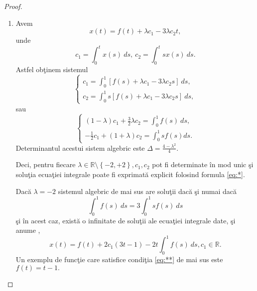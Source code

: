 \documentclass[a4paper,12pt,oneside]{report}
\begin{document}
\begin{proof}
\begin{enumerate}[label=(\alph*)]
  \item Avem
        \begin{displaymath}
        	x\left ( t \right ) = f \left ( t \right ) + \lambda c_{1} - 3 \lambda c_{2}t, \label{eq:*} \tag{*}
        \end{displaymath}
 unde
        \begin{displaymath}
        	c_{1} = \int_{0}^{t} x\left ( s \right ) \ ds,~c_{2} = \int_{0}^{t} sx\left ( s \right ) \ ds.
        \end{displaymath}
Astfel ob\c{t}inem sistemul
        \begin{displaymath}
        	\left\{\begin{matrix}
        	c_{1} = \int_{0}^{1} \left [ f\left ( s \right ) + \lambda c_{1} - 3\lambda c_{2}s \right ]\ ds,\\
        	c_{2} = \int_{0}^{1}s \left [ f\left ( s \right ) + \lambda c_{1} - 3\lambda c_{2}s \right ]\ ds,
        	\end{matrix}\right.
        \end{displaymath}
 sau
 \begin{displaymath}
        	\left\{\begin{matrix}
        	\left ( 1 - \lambda  \right )c_{1} + \frac{3}{2}\lambda c_{2} = \int_{0}^{1}f\left ( s \right ) \ ds,\\
        	-\frac{1}{2}c_{1} + \left ( 1 + \lambda  \right )c_{2} = \int_{0}^{1}s f\left ( s \right ) ds.
        	\end{matrix}\right.
        \end{displaymath}
Determinantul acestui sistem algebric este \(\Delta  =  \frac{4 - \lambda ^{2} }{4}\).

Deci, pentru fiecare \(\lambda \in \mathbb{R} \setminus \left \{ -2,+2 \right \}, c_{1}, c_{2}\) pot fi determinate \^{i}n mod unic \c{s}i solu\c{t}ia ecua\c{t}iei integrale poate fi exprimat\u{a} explicit folosind formula \ref{eq:*}.

\noindent Dac\u{a} \(\lambda = -2\) sistemul algebric de mai sus are solu\c{t}ii dac\u{a} \c{s}i numai dac\u{a}
        \begin{displaymath}
        	\int_{0}^{1}f\left ( s \right ) \ ds  = 3\int_{0}^{1}sf\left ( s  \right )\ ds \label{eq:**} \tag{**}
        \end{displaymath}
\c{s}i \^{i}n acest caz, exist\u{a} o infinitate de solu\c{t}ii ale ecua\c{t}iei integrale date, \c{s}i anume ,
        \begin{displaymath}
        	x\left ( t \right ) = f\left ( t \right ) + 2c_{1}\left ( 3t-1 \right ) - 2t\int_{0}^{1}f\left ( s \right ) \ ds, c_{1 }\in \mathbb{R}.
        \end{displaymath}
Un exemplu de func\c{t}ie care satisfice condi\c{t}ia \ref{eq:**} de mai sus este \(f\left ( t  \right ) = t-1.\)


\end{enumerate}
\end{proof}
\end{document}

